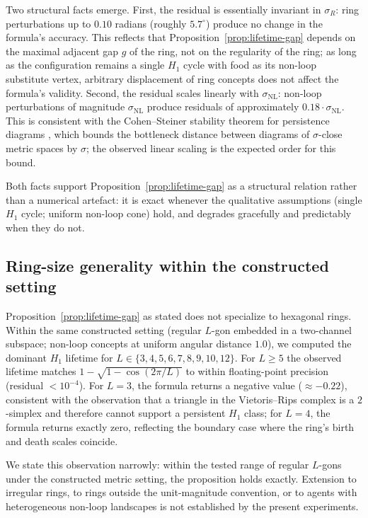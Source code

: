 \documentclass[12pt]{article}
\begin{document}
Two structural facts emerge. First, the residual is essentially
invariant in $\sigma_R$: ring perturbations up to $0.10$ radians
(roughly $5.7^{\circ}$) produce no change in the formula's
accuracy. This reflects that
Proposition~\ref{prop:lifetime-gap} depends on the maximal adjacent
gap $g$ of the ring, not on the regularity of the ring; as long as
the configuration remains a single $H_1$ cycle with food as its
non-loop substitute vertex, arbitrary displacement of ring
concepts does not affect the formula's validity. Second, the
residual scales linearly with $\sigma_\mathrm{NL}$: non-loop
perturbations of magnitude $\sigma_\mathrm{NL}$ produce residuals
of approximately $0.18 \cdot \sigma_\mathrm{NL}$. This is consistent
with the Cohen--Steiner stability theorem for persistence diagrams
\cite{cohenSteiner2007}, which bounds the bottleneck distance
between diagrams of $\sigma$-close metric spaces by $\sigma$; the
observed linear scaling is the expected order for this bound.

Both facts support
Proposition~\ref{prop:lifetime-gap} as a structural relation rather
than a numerical artefact: it is exact whenever the qualitative
assumptions (single $H_1$ cycle; uniform non-loop cone) hold, and
degrades gracefully and predictably when they do not.

\subsection*{Ring-size generality within the constructed setting}

Proposition~\ref{prop:lifetime-gap} as stated does not specialize to
hexagonal rings. Within the same constructed setting (regular
$L$-gon embedded in a two-channel subspace; non-loop concepts at
uniform angular distance $1.0$), we computed the dominant $H_1$
lifetime for $L \in \{3, 4, 5, 6, 7, 8, 9, 10, 12\}$. For
$L \geq 5$ the observed lifetime matches
$1 - \sqrt{1 - \cos(2\pi / L)}$ to within floating-point precision
(residual $< 10^{-4}$). For $L = 3$, the formula returns a
negative value ($\approx -0.22$), consistent with the observation
that a triangle in the Vietoris--Rips complex is a $2$-simplex and
therefore cannot support a persistent $H_1$ class; for $L = 4$,
the formula returns exactly zero, reflecting the boundary case
where the ring's birth and death scales coincide.

We state this observation narrowly: within the tested range of
regular $L$-gons under the constructed metric setting, the
proposition holds exactly. Extension to irregular rings, to rings
outside the unit-magnitude convention, or to agents with
heterogeneous non-loop landscapes is not established by the
present experiments.
\end{document}
